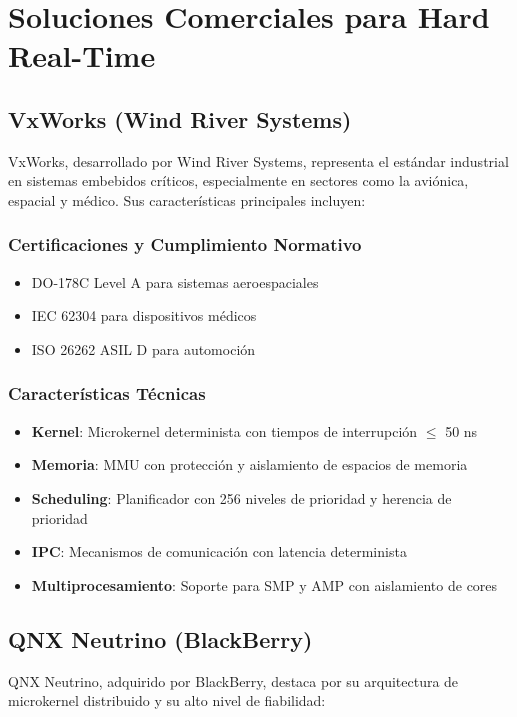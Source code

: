 \newpage
\section{Soluciones Comerciales para Hard Real-Time}

    \subsection{VxWorks (Wind River Systems)}
        VxWorks, desarrollado por Wind River Systems, representa el estándar industrial en sistemas embebidos críticos, especialmente en sectores como la aviónica, espacial y médico. Sus características principales incluyen:

        \subsubsection{Certificaciones y Cumplimiento Normativo}
            \begin{itemize}
                \item DO-178C Level A para sistemas aeroespaciales
                \item IEC 62304 para dispositivos médicos
                \item ISO 26262 ASIL D para automoción
            \end{itemize}
        \subsubsection{Características Técnicas}
            \begin{itemize}
                \item \textbf{Kernel}: Microkernel determinista con tiempos de interrupción $\le$ 50 ns
                \item \textbf{Memoria}: MMU con protección y aislamiento de espacios de memoria
                \item \textbf{Scheduling}: Planificador con 256 niveles de prioridad y herencia de prioridad
                \item \textbf{IPC}: Mecanismos de comunicación con latencia determinista
                \item \textbf{Multiprocesamiento}: Soporte para SMP y AMP con aislamiento de cores
            \end{itemize}

    \subsection{QNX Neutrino (BlackBerry)}
        QNX Neutrino, adquirido por BlackBerry, destaca por su arquitectura de microkernel distribuido y su alto nivel de fiabilidad:


